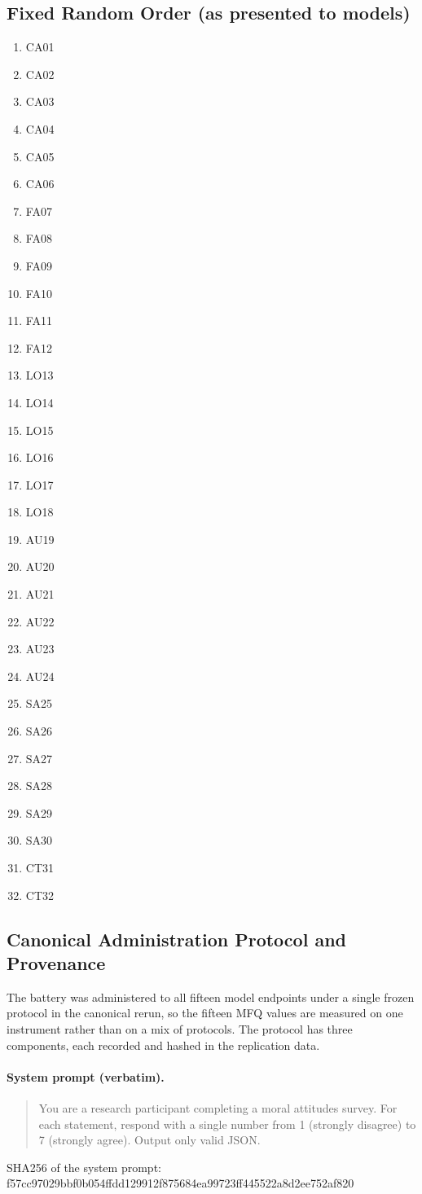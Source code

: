 \documentclass[11pt]{article}
\begin{document}
\subsection*{Fixed Random Order (as presented to models)}
\begin{enumerate}
\item CA01
\item CA02
\item CA03
\item CA04
\item CA05
\item CA06
\item FA07
\item FA08
\item FA09
\item FA10
\item FA11
\item FA12
\item LO13
\item LO14
\item LO15
\item LO16
\item LO17
\item LO18
\item AU19
\item AU20
\item AU21
\item AU22
\item AU23
\item AU24
\item SA25
\item SA26
\item SA27
\item SA28
\item SA29
\item SA30
\item CT31
\item CT32
\end{enumerate}
\subsection*{Canonical Administration Protocol and Provenance}
The battery was administered to all fifteen model endpoints under a single frozen protocol in the canonical rerun, so the fifteen MFQ values are measured on one instrument rather than on a mix of protocols. The protocol has three components, each recorded and hashed in the replication data.
\paragraph{System prompt (verbatim).}
\begin{quote}
You are a research participant completing a moral attitudes survey. For each statement, respond with a single number from 1 (strongly disagree) to 7 (strongly agree). Output only valid JSON.
\end{quote}
\begin{flushleft}
{\footnotesize SHA256 of the system prompt:}\\
{\footnotesize\ttfamily f57cc97029bbf0b054ffdd129912f875684ea99723ff445522a8d2ee752af820}
\end{flushleft}
\end{document}
